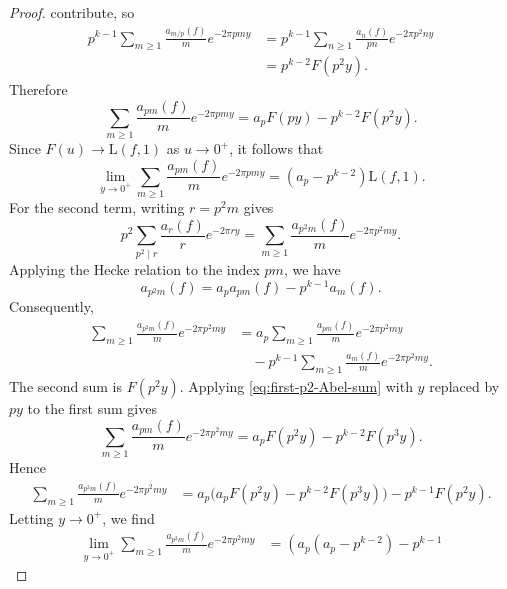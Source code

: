 \documentclass[10pt,a4paper]{amsart}
\begin{document}
\begin{proof}
contribute, so
\[
\begin{aligned}
        p^{k-1}
        \sum_{m\geq1}
        \frac{a_{m/p}(f)}m e^{-2\pi pmy}
        &=
        p^{k-1}
        \sum_{n\geq1}
        \frac{a_n(f)}{pn}e^{-2\pi p^2ny} \\
        &=
        p^{k-2}F(p^2y).
\end{aligned}
\]
Therefore
\begin{equation}
\label{eq:first-p2-Abel-sum}
        \sum_{m\geq1}
        \frac{a_{pm}(f)}m e^{-2\pi pmy}
        =
        a_pF(py)-p^{k-2}F(p^2y).
\end{equation}
Since \(F(u)\to\mathrm{L}(f,1)\) as \(u\to0^+\), it follows that
\begin{equation}
\label{eq:first-p2-Abel-limit}
        \lim_{y\to0^+}
        \sum_{m\geq1}
        \frac{a_{pm}(f)}m e^{-2\pi pmy}
        =
        (a_p-p^{k-2})\mathrm{L}(f,1).
\end{equation}
For the second term, writing \(r=p^2m\) gives
\[
        p^2\sum_{p^2\mid r}
        \frac{a_r(f)}r e^{-2\pi ry}
        =
        \sum_{m\geq1}
        \frac{a_{p^2m}(f)}m e^{-2\pi p^2my}.
\]
Applying the Hecke relation to the index \(pm\), we have
\[
        a_{p^2m}(f)
        =
        a_pa_{pm}(f)-p^{k-1}a_m(f).
\]
Consequently,
\[
\begin{aligned}
        \sum_{m\geq1}
        \frac{a_{p^2m}(f)}m e^{-2\pi p^2my}
        &=
        a_p
        \sum_{m\geq1}
        \frac{a_{pm}(f)}m e^{-2\pi p^2my}       \\
        &\quad
        -
        p^{k-1}
        \sum_{m\geq1}
        \frac{a_m(f)}m e^{-2\pi p^2my}.
\end{aligned}
\]
The second sum is \(F(p^2y)\). Applying
\eqref{eq:first-p2-Abel-sum} with \(y\) replaced by \(py\) to the
first sum gives
\[
        \sum_{m\geq1}
        \frac{a_{pm}(f)}m e^{-2\pi p^2my}
        =
        a_pF(p^2y)-p^{k-2}F(p^3y).
\]
Hence
\[
\begin{aligned}
        \sum_{m\geq1}
        \frac{a_{p^2m}(f)}m e^{-2\pi p^2my}
        &=
        a_p
        \bigl(
        a_pF(p^2y)-p^{k-2}F(p^3y)
        \bigr)
        -
        p^{k-1}F(p^2y).
\end{aligned}
\]
Letting \(y\to0^+\), we find
\begin{equation}
\label{eq:second-p2-Abel-limit}
\begin{aligned}
        \lim_{y\to0^+}
        \sum_{m\geq1}
        \frac{a_{p^2m}(f)}m e^{-2\pi p^2my}
        &=
        \left(
        a_p(a_p-p^{k-2})-p^{k-1}

\end{aligned}
\end{equation}
\end{proof}
\end{document}
